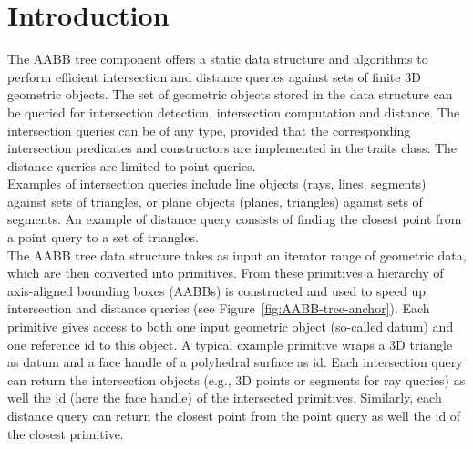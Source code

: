 \section{Introduction}
\label{AABB_tree_section_intro}

The AABB tree component offers a static data structure and algorithms to perform efficient intersection and distance queries against sets of finite 3D geometric objects. The set of geometric objects stored in the data structure can be queried for intersection detection, intersection computation and distance. The intersection queries can be of any type, provided that the corresponding intersection predicates and constructors are implemented in the traits class. The distance queries are limited to point queries.\\

Examples of intersection queries include line objects (rays, lines, segments) against sets of triangles, or plane objects (planes, triangles) against sets of segments. An example of distance query consists of finding the closest point from a point query to a set of triangles.\\

The AABB tree data structure takes as input an iterator range of geometric data, which are then converted into primitives. From these primitives a hierarchy of axis-aligned bounding boxes (AABBs) is constructed and used to speed up intersection and distance queries (see Figure~\ref{fig:AABB-tree-anchor}). 
Each primitive gives access to both one input geometric object (so-called datum) and one reference id to this object. A typical example primitive wraps a 3D triangle as datum and a face handle of a polyhedral surface as id. Each intersection query can return the intersection objects (e.g., 3D points or segments for ray queries) as well the id (here the face handle) of the intersected primitives. Similarly, each distance query can return the closest point from the point query as well the id of the closest primitive. 

